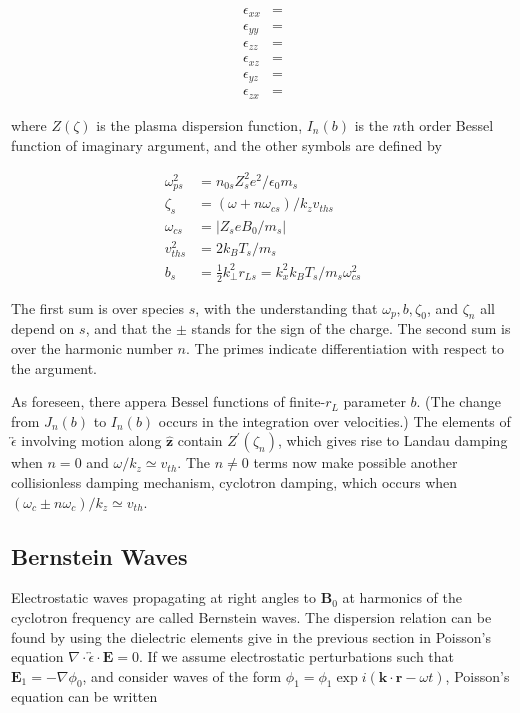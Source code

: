 \documentclass[
  notoc %
]{tufte-book}
\begin{document}
\[
\begin{aligned}
\epsilon_{xx} &= \\
\epsilon_{yy} &= \\
\epsilon_{zz} &= \\
\epsilon_{xz} &= \\
\epsilon_{yz} &= \\
\epsilon_{zx} &=
\end{aligned}
\]

where \(Z(\zeta)\) is the plasma dispersion function, \(I_n(b)\) is the
\(n\)th order Bessel function of imaginary argument, and the other
symbols are defined by

\[
\begin{aligned}
\omega_{ps}^2 &= n_{0s} Z_s^2 e^2 / \epsilon_0 m_s \\
\zeta_s &= (\omega+n\omega_{cs})/k_z v_{ths} \\
\omega_{cs} &= |Z_seB_0/m_s| \\
v_{ths}^2 &= 2k_B T_s/m_s \\
b_s &= \frac{1}{2}k_\perp^2 r_{Ls} = k_x^2 k_B T_s / m_s \omega_{cs}^2
\end{aligned}
\]

The first sum is over species \(s\), with the understanding that
\(\omega_p, b, \zeta_0\), and \(\zeta_n\) all depend on \(s\), and that
the \(\pm\) stands for the sign of the charge. The second sum is over
the harmonic number \(n\). The primes indicate differentiation with
respect to the argument.

As foreseen, there appera Bessel functions of finite-\(r_L\) parameter
\(b\). (The change from \(J_n(b)\) to \(I_n(b)\) occurs in the
integration over velocities.) The elements of
\(\overleftrightarrow{\epsilon}\) involving motion along
\(\hat{\mathbf{z}}\) contain \(Z^\prime(\zeta_n)\), which gives rise to
Landau damping when \(n=0\) and \(\omega/k_z\simeq v_{th}\). The
\(n\neq 0\) terms now make possible another collisionless damping
mechanism, cyclotron damping, which occurs when
\((\omega_c \pm n\omega_c)/k_z\simeq v_{th}\).

\hypertarget{bernstein-waves}{%
\subsection{Bernstein Waves}\label{bernstein-waves}}

Electrostatic waves propagating at right angles to \(\mathbf{B}_0\) at
harmonics of the cyclotron frequency are called Bernstein waves. The
dispersion relation can be found by using the dielectric elements give
in the previous section in Poisson's equation
\(\nabla\cdot\overleftrightarrow{\epsilon}\cdot\mathbf{E}=0\). If we
assume electrostatic perturbations such that
\(\mathbf{E}_1=-\nabla\phi_0\), and consider waves of the form
\(\phi_1=\phi_1\exp i(\mathbf{k}\cdot\mathbf{r}-\omega t)\), Poisson's
equation can be written
\end{document}
